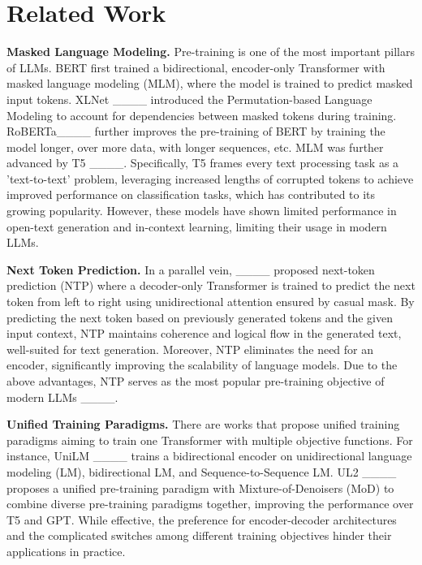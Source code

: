 \section{Related Work}

\textbf{Masked Language Modeling.} Pre-training is one of the most important pillars of LLMs. BERT first trained a bidirectional, encoder-only Transformer with masked language modeling (MLM), where the model is trained to predict masked input tokens. XLNet ____ introduced the Permutation-based Language Modeling to account for dependencies between masked tokens during training. RoBERTa____ further improves 
the pre-training of BERT by training the model longer,
over more data, with longer sequences, etc. MLM was further advanced by T5 ____. Specifically, T5 frames every text processing task as a 'text-to-text' problem, leveraging increased lengths of corrupted tokens to achieve improved performance on classification tasks, which has contributed to its growing popularity. However, these models have shown limited performance in open-text generation and in-context learning, limiting their usage in modern LLMs.

\textbf{Next Token Prediction.} In a parallel vein, ____ proposed next-token prediction (NTP) where a decoder-only Transformer is trained to predict the next token from left to right using unidirectional attention ensured by casual mask. By predicting the next token based on previously generated tokens and the given input context, NTP maintains coherence and logical flow in the generated text, well-suited for text generation. Moreover, NTP eliminates the need for an encoder, significantly improving the scalability of language models. Due to the above advantages, NTP serves as the most popular pre-training objective of modern LLMs ____. 

\textbf{Unified Training Paradigms.} There are works that propose unified training paradigms aiming to train one Transformer with multiple objective functions. For instance, UniLM ____ trains a bidirectional encoder on unidirectional language modeling (LM), bidirectional LM, and Sequence-to-Sequence LM. UL2 ____ proposes a unified pre-training paradigm with Mixture-of-Denoisers (MoD) to combine diverse pre-training paradigms together, improving the performance over T5 and GPT. 
While effective, the preference for encoder-decoder architectures and the complicated switches among different training objectives hinder their applications in practice. 

